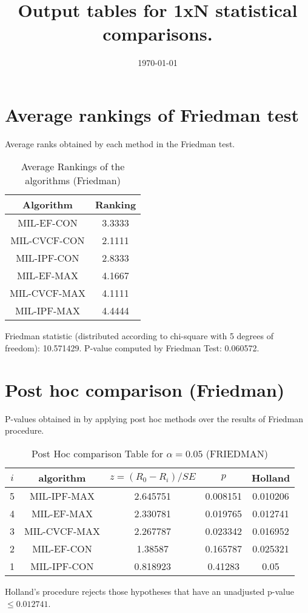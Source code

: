\documentclass[a4paper,10pt]{article}
\title{Output tables for 1xN statistical comparisons.}
\author{}
\date{\today}
\begin{document}
\begin{landscape}
\pagestyle{empty}
\maketitle
\thispagestyle{empty}

\section{Average rankings of Friedman test}


Average ranks obtained by each method in the Friedman test.

\begin{table}[!htp]
\centering
\begin{tabular}{|c|c|}\hline
Algorithm&Ranking\\\hline
MIL-EF-CON&3.3333\\MIL-CVCF-CON&2.1111\\MIL-IPF-CON&2.8333\\MIL-EF-MAX&4.1667\\MIL-CVCF-MAX&4.1111\\MIL-IPF-MAX&4.4444\\\hline\end{tabular}
\caption{Average Rankings of the algorithms (Friedman)}
\end{table}

Friedman statistic (distributed according to chi-square with 5 degrees of freedom): 10.571429. \newline P-value computed by Friedman Test: 0.060572.\newline


\newpage

\section{Post hoc comparison (Friedman)}


P-values obtained in by applying post hoc methods over the results of Friedman procedure.

\begin{table}[!htp]
\centering\footnotesize
\begin{tabular}{ccccc}
$i$&algorithm&$z=(R_0 - R_i)/SE$&$p$&Holland\\
\hline5&MIL-IPF-MAX&2.645751&0.008151&0.010206\\4&MIL-EF-MAX&2.330781&0.019765&0.012741\\3&MIL-CVCF-MAX&2.267787&0.023342&0.016952\\2&MIL-EF-CON&1.38587&0.165787&0.025321\\1&MIL-IPF-CON&0.818923&0.41283&0.05\\\hline
\end{tabular}
\caption{Post Hoc comparison Table for $\alpha=0.05$ (FRIEDMAN)}
\end{table}Holland's procedure rejects those hypotheses that have an unadjusted p-value $\le0.012741$.



\end{landscape}
\end{document}
